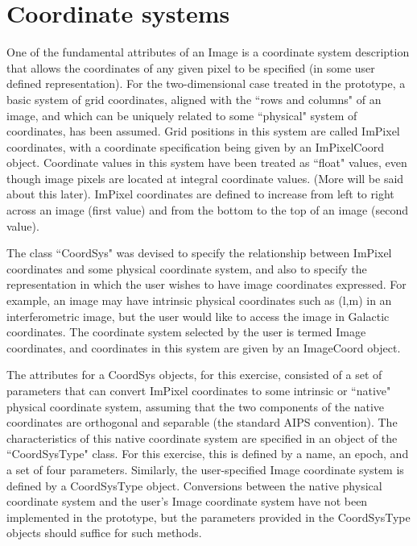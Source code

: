 \section{Coordinate systems}

        One of the fundamental attributes of an Image is a coordinate system
description that allows the coordinates of any given pixel to be specified 
(in some user defined representation). For the two-dimensional case
treated in the prototype, a basic system of grid coordinates, aligned with
the ``rows and columns" of an image, and which can be uniquely related to
some ``physical" system of coordinates, has been assumed. Grid positions
in this system are called ImPixel coordinates, with a coordinate specification
being given by an ImPixelCoord object. Coordinate values in this system
have been treated as ``float" values, even though image pixels are located
at integral coordinate values. (More will be said about this later).
ImPixel coordinates are defined to increase from left to right across an
image (first value) and from the bottom to the top of an image (second
value). 

        The class ``CoordSys" was devised to specify the relationship
between ImPixel coordinates and some physical coordinate system, and also
to specify the representation in which the user wishes to have image
coordinates expressed. For example, an image may have intrinsic physical
coordinates such as (l,m) in an interferometric image, but the user would
like to access the image in Galactic coordinates. The coordinate system
selected by the user is termed Image coordinates, and coordinates in this
system are given by an ImageCoord object.

        The attributes for a CoordSys objects, for this exercise, consisted
of a set of parameters that can convert ImPixel coordinates to some intrinsic
or ``native" physical coordinate system, assuming that the two components of 
the native coordinates are orthogonal and separable (the standard AIPS 
convention).  The characteristics of this native coordinate system are 
specified in an object of the ``CoordSysType" class. For this exercise, this
is defined by a name, an epoch, and a set of four parameters. Similarly,
the user-specified Image coordinate system is defined by a CoordSysType
object. Conversions between the native physical coordinate system and
the user's Image coordinate system have not been implemented in the
prototype, but the parameters provided in the CoordSysType objects should
suffice for such methods.

